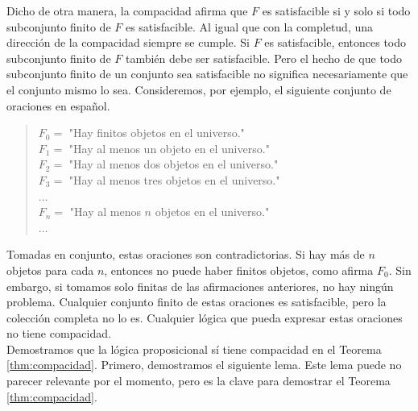 \documentclass[12pt,a4paper]{book}
\newcommand{\comillas}[1]{"#1"}
\begin{document}
    Dicho de otra manera, la compacidad afirma que $F$ es satisfacible si y solo si todo subconjunto finito de $F$ es
    satisfacible. Al igual que con la completud, una dirección de la compacidad siempre se cumple. Si $F$ es satisfacible,
    entonces todo subconjunto finito de $F$ también debe ser satisfacible. Pero el hecho de que todo subconjunto finito de
    un conjunto sea satisfacible no significa necesariamente que el conjunto mismo lo sea. Consideremos, por ejemplo, el
    siguiente conjunto de oraciones en español.

    \begin{quote}
        $F_{0}=$ \comillas{Hay finitos objetos en el universo.}\\
        $F_{1}=$ \comillas{Hay al menos un objeto en el universo.}\\
        $F_{2}=$ \comillas{Hay al menos dos objetos en el universo.}\\
        $F_{3}=$ \comillas{Hay al menos tres objetos en el universo.}\\
        $\dots$\\
        $F_{n}=$ \comillas{Hay al menos $n$ objetos en el universo.}\\
        $\dots$
    \end{quote}

    Tomadas en conjunto, estas oraciones son contradictorias. Si hay más de $n$ objetos para cada $n$, entonces no puede
    haber finitos objetos, como afirma $F_{0}$. Sin embargo, si tomamos solo finitas de las afirmaciones anteriores, no hay
    ningún problema. Cualquier conjunto finito de estas oraciones es satisfacible, pero la colección completa no lo es.
    Cualquier lógica que pueda expresar estas oraciones no tiene compacidad.\\
    Demostramos que la lógica proposicional sí tiene compacidad en el Teorema \ref{thm:compacidad}. Primero, demostramos el
    siguiente lema. Este lema puede no parecer relevante por el momento, pero es la clave para demostrar el Teorema
    \ref{thm:compacidad}.
\end{document}
